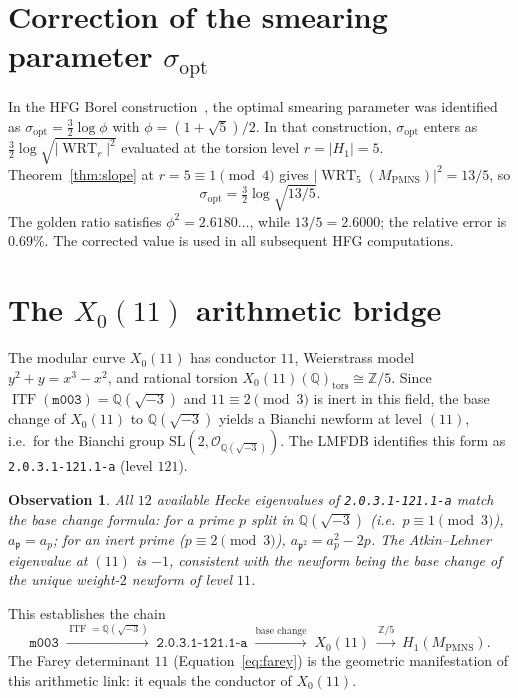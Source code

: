 \documentclass[11pt,a4paper]{article}
\newtheorem{observation}[theorem]{Observation}
\theoremstyle{definition}
\newcommand{\Z}{\mathbb{Z}}
\newcommand{\Q}{\mathbb{Q}}
\newcommand{\mfld}[1]{\texttt{#1}}
\newcommand{\WRT}{\operatorname{WRT}}
\newcommand{\ITF}{\operatorname{ITF}}
\newcommand{\SL}[2]{\mathrm{SL}(#1,#2)}
\begin{document}
\section{Correction of the smearing parameter $\sigma_{\mathrm{opt}}$}
\label{sec:sigma}

In the HFG Borel construction~\cite{GentryUnified}, the optimal
smearing parameter was identified as $\sigma_{\mathrm{opt}}=\tfrac32\log\phi$
with $\phi=(1+\sqrt5)/2$.
In that construction, $\sigma_{\mathrm{opt}}$ enters as
$\tfrac{3}{2}\log\sqrt{|\WRT_r|^2}$ evaluated at the torsion
level $r=|H_1|=5$.
Theorem~\ref{thm:slope} at $r=5\equiv1\pmod4$ gives
$|\WRT_5(M_{\mathrm{PMNS}})|^2=13/5$, so
\begin{equation}
\sigma_{\mathrm{opt}} = \tfrac32\log\sqrt{13/5}.
\end{equation}
The golden ratio satisfies $\phi^2=2.6180\ldots$, while $13/5=2.6000$;
the relative error is $0.69\%$. The corrected value is used in all
subsequent HFG computations.

\section{The $X_0(11)$ arithmetic bridge}
\label{sec:x011}

The modular curve $X_0(11)$ has conductor $11$, Weierstrass model
$y^2+y=x^3-x^2$, and rational torsion $X_0(11)(\Q)_{\mathrm{tors}}\cong\Z/5$.
Since $\ITF(\mfld{m003})=\Q(\sqrt{-3})$ and $11\equiv2\pmod3$ is inert
in this field, the base change of $X_0(11)$ to $\Q(\sqrt{-3})$ yields a
Bianchi newform at level $(11)$, i.e.\ for the Bianchi group
$\SL{2}{\mathcal{O}_{\Q(\sqrt{-3})}}$.
The LMFDB identifies this form as \texttt{2.0.3.1-121.1-a} (level $121$).

\begin{observation}
\label{obs:hecke}
All $12$ available Hecke eigenvalues of \texttt{2.0.3.1-121.1-a}
match the base change formula: for a prime $p$ split in $\Q(\sqrt{-3})$
(i.e.\ $p\equiv1\pmod3$), $a_{\mathfrak{p}}=a_p$; for an inert prime
($p\equiv2\pmod3$), $a_{\mathfrak{p}^2}=a_p^2-2p$.
The Atkin--Lehner eigenvalue at $(11)$ is $-1$, consistent with the
newform being the base change of the unique weight-$2$ newform of
level $11$.
\end{observation}

This establishes the chain
\begin{equation*}
\mfld{m003}
\;\xrightarrow{\ITF=\Q(\sqrt{-3})}\;
\texttt{2.0.3.1-121.1-a}
\;\xrightarrow{\text{base change}}\;
X_0(11)
\;\xrightarrow{\Z/5}\;
H_1(M_{\mathrm{PMNS}}).
\end{equation*}
The Farey determinant $11$ (Equation~\eqref{eq:farey}) is the geometric
manifestation of this arithmetic link: it equals the conductor of $X_0(11)$.
\end{document}
